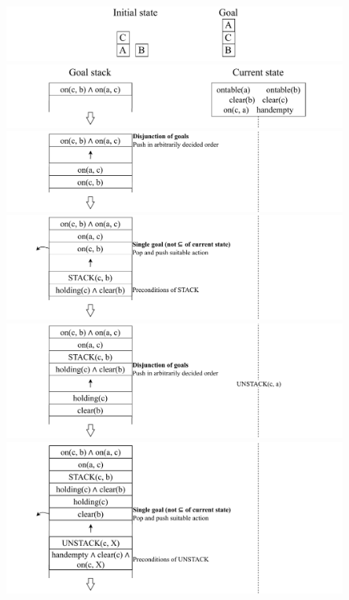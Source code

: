 \begin{example} 
    \begin{center}
        \includegraphics[width=0.85\textwidth]{img/_strips_example1.pdf}
        \includegraphics[width=0.85\textwidth]{img/_strips_example2.pdf}
        \includegraphics[width=0.85\textwidth]{img/_strips_example3.pdf}
        \includegraphics[width=0.85\textwidth]{img/_strips_example4.pdf}
        \includegraphics[width=0.85\textwidth]{img/_strips_example5.pdf}
        \includegraphics[width=0.85\textwidth]{img/_strips_example6.pdf}

\end{center}
\end{example}
